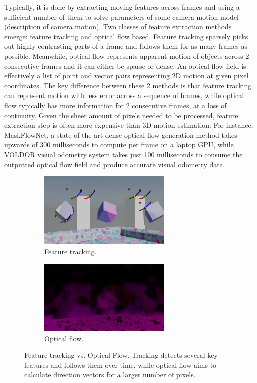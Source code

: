 \documentclass[11pt,english]{report}
\begin{document}
Typically, it is done by extracting moving features across frames and using a sufficient number of them to solve parameters of some camera motion model (description of camera motion). Two classes of feature extraction methods emerge: feature tracking and optical flow based. Feature tracking sparsely picks out highly contrasting parts of a frame and follows them for as many frames as possible. Meanwhile, optical flow represents apparent motion of objects across 2 consecutive frames and it can either be sparse or dense. An optical flow field is effectively a list of point and vector pairs representing 2D motion at given pixel coordinates. The key difference between these 2 methods is that feature tracking can represent motion with less error across a sequence of frames, while optical flow typically has more information for 2 consecutive frames, at a loss of continuity. Given the sheer amount of pixels needed to be processed, feature extraction step is often more expensive than 3D motion estimation. For instance, MaskFlowNet\cite{zhao2020maskflownet}, a state of the art dense optical flow generation method takes upwards of 300 milliseconds to compute per frame on a laptop GPU, while VOLDOR\cite{voldor} visual odometry system takes just 100 milliseconds to consume the outputted optical flow field and produce accurate visual odometry data.

\begin{figure}[!ht]
	\centering
	\begin{subfigure}{180pt}
		\includegraphics[width=180pt]{docs/report/feature-tracking.jpg}
		\caption{\centering Feature tracking.}
	\end{subfigure}
	\begin{subfigure}{180pt}
		\includegraphics[width=180pt]{docs/report/optical-flow.jpg}
		\caption{\centering Optical flow.}
	\end{subfigure}
	\caption{\centering Feature tracking vs. Optical Flow. Tracking detects several key features and follows them over time, while optical flow aims to calculate direction vectors for a larger number of pixels.}
\end{figure}
\end{document}

